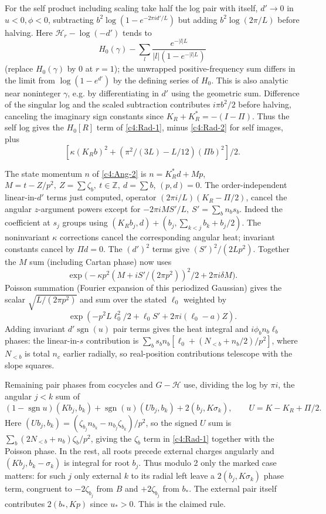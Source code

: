 For the self product including scaling take half the log pair with itself, \(d'\to0\) in \(u<0,\phi<0\), subtracting \(b^2\log(1-e^{-2\pi i d'/L})\) but adding \(b^2\log(2\pi/L)\) before halving. Here \(\mathcal H_r-\log(-d')\) tends to
\[
 H_0(\gamma)-\sum_l\frac{e^{-|l|L}}{|l|(1-e^{-|l|L})}
\]
(replace \(H_0(\gamma)\) by 0 at \(r=1\)); the unwrapped positive-frequency sum differs in the limit from \(\log(1-e^{d'})\) by the defining series of \(H_0\). This is also analytic near noninteger \(\gamma\), e.g. by differentiating in \(d'\) using the geometric sum. Difference of the singular log and the scaled subtraction contributes \(i\pi b^2/2\) before halving, canceling the imaginary sign constants since \(K_R+K_R^*=-(I-\Pi)\). Thus the self log gives the \(H_0[R]\) term of \eqref{c4:Rad-1}, minus \eqref{c4:Rad-2} for self images, plus
\[
 [\kappa(K_R b)^2+(\pi^2/(3L)-L/12)(\Pi b)^2]/2 .
\]

The state momentum \(n\) of \eqref{c4:Ang-2} is \(n=K_R^*d+M p\), \(M=t-Z/p^2,\ Z=\sum\zeta_b,\ t\in\mathbb Z,\ d=\sum b\), \((p,d)=0\).
The order-independent linear-in-\(d'\) terms just computed, operator \((2\pi i/L)(K_R-\Pi/2)\), cancel the angular \(z\)-argument powers except for \(-2\pi i M S'/L,\ S'=\sum_b n_b s_b\). Indeed the coefficient at \(s_j\) groups using \((K_R b_j,d)+(b_j,\sum_{k<j}b_k+b_j/2)\). The noninvariant \(\kappa\) corrections cancel the corresponding angular heat; invariant constants cancel by \(\Pi d=0\). The \((d')^2\) terms give \((S')^2/(2Lp^2)\). Together the \(M\) sum (including Cartan phase) now uses
\[
 \exp\!\big(-\kappa p^2(M+i S'/(2\pi p^2))^2/2+2\pi i\delta M\big).
\]
Poisson summation (Fourier expansion of this periodized Gaussian) gives the scalar \(\sqrt{L/(2\pi p^2)}\) and sum over the stated \(\ell_0\) weighted by
\[
 \exp(-p^2 L\ell_0^2/2+\ell_0 S'+2\pi i(\ell_0-a)Z).
\]
Adding invariant \(d'\operatorname{sgn}(u)\) pair terms gives the heat integral and \(i\phi_b n_b\ell_b\) phases: the linear-in-\(s\) contribution is \(\sum_b s_b n_b[\ell_0+(N_{<b}+n_b/2)/p^2]\), where \(N_{<b}\) is total \(n_c\) earlier radially, so real-position contributions telescope with the slope squares.

Remaining pair phases from cocycles and \(G-\mathcal H\) use, dividing the log by \(\pi i\), the angular \(j<k\) sum of
\[
 (1-\operatorname{sgn}u)(K b_j,b_k)+\operatorname{sgn}(u)(U b_j,b_k)+2(b_j,K\sigma_k),\qquad U=K-K_R+\Pi/2.
\]
Here \((U b_j,b_k)=(\zeta_{b_j} n_{b_k}-n_{b_j}\zeta_{b_k})/p^2\), so the signed \(U\) sum is \(\sum_b(2N_{<b}+n_b)\zeta_b/p^2\), giving the \(\zeta_b\) term in \eqref{c4:Rad-1} together with the Poisson phase. In the rest, all roots precede external charges angularly and \((K b_j,b_k-\sigma_k)\) is integral for root \(b_j\). Thus modulo 2 only the marked case matters: for such \(j\) only external \(k\) to its radial left leave a \(2(b_j,K\sigma_k)\) phase term, congruent to \(-2\zeta_{b_j}\) from \(B\) and \(+2\zeta_{b_j}\) from \(b_*\). The external pair itself contributes \(2(b_*,Kp)\) since \(u_*>0\). This is the claimed rule.

